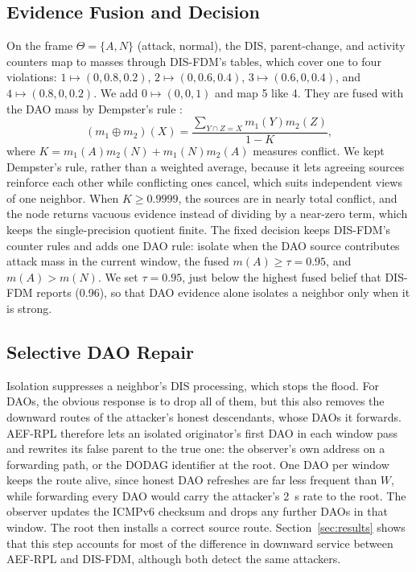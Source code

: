 \subsection{Evidence Fusion and Decision}
On the frame $\Theta=\{A,N\}$ (attack, normal), the DIS, parent-change, and activity counters map to masses through DIS-FDM's tables, which cover one to four violations: $1\mapsto(0,0.8,0.2)$, $2\mapsto(0,0.6,0.4)$, $3\mapsto(0.6,0,0.4)$, and $4\mapsto(0.8,0,0.2)$. We add $0\mapsto(0,0,1)$ and map 5 like 4. They are fused with the DAO mass by Dempster's rule \cite{sentz2002}:
\begin{equation}
 (m_1\oplus m_2)(X)=\frac{\sum_{Y\cap Z=X}m_1(Y)m_2(Z)}{1-K},
\end{equation}
where $K=m_1(A)m_2(N)+m_1(N)m_2(A)$ measures conflict. We kept Dempster's rule, rather than a weighted average, because it lets agreeing sources reinforce each other while conflicting ones cancel, which suits independent views of one neighbor. When $K\ge0.9999$, the sources are in nearly total conflict, and the node returns vacuous evidence instead of dividing by a near-zero term, which keeps the single-precision quotient finite. The fixed decision keeps DIS-FDM's counter rules and adds one DAO rule: isolate when the DAO source contributes attack mass in the current window, the fused $m(A)\ge\tau=0.95$, and $m(A)>m(N)$. We set $\tau=0.95$, just below the highest fused belief that DIS-FDM reports (0.96), so that DAO evidence alone isolates a neighbor only when it is strong.

\subsection{Selective DAO Repair}
Isolation suppresses a neighbor's DIS processing, which stops the flood. For DAOs, the obvious response is to drop all of them, but this also removes the downward routes of the attacker's honest descendants, whose DAOs it forwards. AEF-RPL therefore lets an isolated originator's first DAO in each window pass and rewrites its false parent to the true one: the observer's own address on a forwarding path, or the DODAG identifier at the root. One DAO per window keeps the route alive, since honest DAO refreshes are far less frequent than $W$, while forwarding every DAO would carry the attacker's 2~s rate to the root. The observer updates the ICMPv6 checksum and drops any further DAOs in that window. The root then installs a correct source route. Section~\ref{sec:results} shows that this step accounts for most of the difference in downward service between AEF-RPL and DIS-FDM, although both detect the same attackers.

